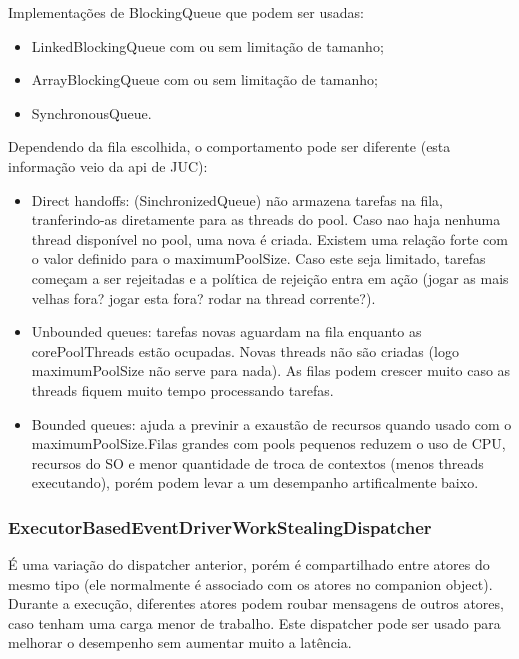 \documentclass[]{article}
\begin{document}
			Implementações de BlockingQueue que podem ser usadas:
			\begin{itemize}
				\item LinkedBlockingQueue com ou sem limitação de tamanho;
				\item ArrayBlockingQueue com ou sem limitação de tamanho;
				\item SynchronousQueue.
			\end{itemize}
			Dependendo da fila escolhida, o comportamento pode ser diferente (esta informação veio da api de JUC):
			\begin{itemize}
				\item Direct handoffs: (SinchronizedQueue) não armazena tarefas na fila, tranferindo-as diretamente para
				as threads do pool.
				Caso nao haja nenhuma thread disponível no pool, uma nova é criada. Existem uma relação forte com o valor
				definido para o maximumPoolSize. Caso este seja limitado, tarefas começam a ser rejeitadas e a política
				de rejeição entra em ação (jogar as mais velhas fora? jogar esta fora? rodar na thread corrente?).

				\item Unbounded queues: tarefas novas aguardam na fila enquanto as corePoolThreads estão ocupadas. Novas
				threads não são criadas (logo maximumPoolSize não serve para nada). As filas podem crescer muito caso
				as threads fiquem muito tempo processando tarefas.
				
				\item Bounded queues: ajuda a previnir a exaustão de recursos quando usado com o maximumPoolSize.Filas
				grandes com pools pequenos reduzem o uso de CPU, recursos do SO e menor quantidade de troca de 
				contextos (menos threads executando), porém podem levar a um desempanho artificalmente baixo.				
			\end{itemize}
						
			\subsubsection{ExecutorBasedEventDriverWorkStealingDispatcher}
			É uma variação do dispatcher anterior, porém é compartilhado entre atores do mesmo tipo 
			(ele normalmente é associado com os atores no companion object). Durante a execução, diferentes atores
			podem roubar mensagens de outros atores, caso tenham uma carga menor de trabalho. Este dispatcher pode
			ser usado para melhorar o desempenho sem aumentar muito a latência.\\
\end{document}
